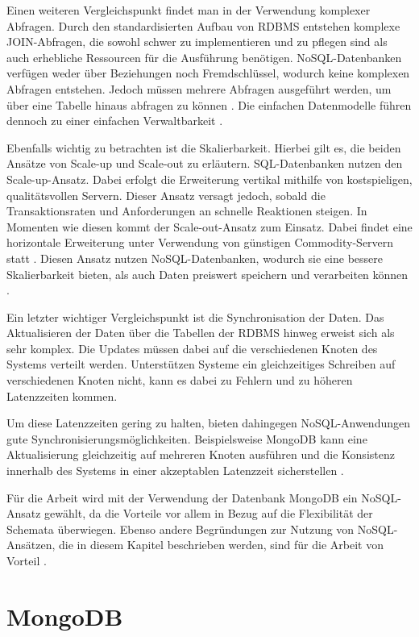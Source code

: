 Einen weiteren Vergleichspunkt findet man in der Verwendung komplexer Abfragen. Durch den standardisierten Aufbau von RDBMS entstehen komplexe JOIN-Abfragen, die sowohl schwer zu implementieren und zu pflegen sind als auch erhebliche Ressourcen für die Ausführung benötigen. NoSQL-Datenbanken verfügen weder über Beziehungen noch Fremdschlüssel, wodurch keine komplexen Abfragen entstehen. Jedoch müssen mehrere Abfragen ausgeführt werden, um über eine Tabelle hinaus abfragen zu können \cite[S19f.]{zwei}. Die einfachen Datenmodelle führen dennoch zu einer einfachen Verwaltbarkeit \cite[S.18]{zwei}.

Ebenfalls wichtig zu betrachten ist die Skalierbarkeit. Hierbei gilt es, die beiden Ansätze von Scale-up und Scale-out zu erläutern. SQL-Datenbanken nutzen den Scale-up-Ansatz. Dabei erfolgt die Erweiterung vertikal mithilfe von kostspieligen, qualitätsvollen Servern. Dieser Ansatz versagt jedoch, sobald die Transaktionsraten und Anforderungen an schnelle Reaktionen steigen. In Momenten wie diesen kommt der Scale-out-Ansatz zum Einsatz. Dabei findet eine horizontale Erweiterung unter Verwendung von günstigen Commodity-Servern statt \cite[S.18]{zwei}. Diesen Ansatz nutzen NoSQL-Datenbanken, wodurch sie eine bessere Skalierbarkeit bieten, als auch Daten preiswert speichern und verarbeiten können \cite[S.19f.]{zwei}.

Ein letzter wichtiger Vergleichspunkt ist die Synchronisation der Daten. Das Aktualisieren der Daten über die Tabellen der RDBMS hinweg erweist sich als sehr komplex. Die Updates müssen dabei auf die verschiedenen Knoten des Systems verteilt werden. Unterstützen Systeme ein gleichzeitiges Schreiben auf verschiedenen Knoten nicht, kann es dabei zu Fehlern und zu höheren Latenzzeiten kommen. 

Um diese Latenzzeiten gering zu halten, bieten dahingegen NoSQL-Anwendungen gute Synchronisierungsmöglichkeiten. Beispielsweise MongoDB kann eine Aktualisierung gleichzeitig auf mehreren Knoten ausführen und die Konsistenz innerhalb des Systems in einer akzeptablen Latenzzeit sicherstellen \cite[S.19f.]{zwei}.

Für die Arbeit wird mit der Verwendung der Datenbank MongoDB ein NoSQL-Ansatz gewählt, da die Vorteile vor allem in Bezug auf die Flexibilität der Schemata überwiegen. Ebenso andere Begründungen zur Nutzung von NoSQL-Ansätzen, die in diesem Kapitel beschrieben werden, sind für die Arbeit von Vorteil \cite[S.17-20]{zwei}.

\chapter{MongoDB}

